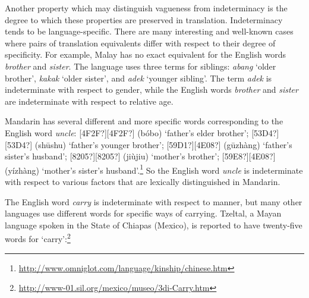 Another property which may distinguish vagueness from indeterminacy is the degree to which these properties are preserved in translation. Indeterminacy tends to be language-specific. There are many interesting and well-known cases where pairs of translation equivalents differ with respect to their degree of specificity. For example, Malay has no exact equivalent for the English words \textit{brother} and \textit{sister}. The language uses three terms for siblings: \textit{abang} ‘older brother’, \textit{kakak} ‘older sister’, and \textit{adek} ‘younger sibling’. The term \textit{adek} is indeterminate with respect to gender, while the English words \textit{brother} and \textit{sister} are indeterminate with respect to relative age.



Mandarin has several different and more specific words corresponding to the English word \textit{uncle}: [4F2F?][4F2F?] (bóbo) ‘father’s elder brother’; [53D4?][53D4?] (sh\=ushu) ‘father’s younger brother’; [59D1?][4E08?] (g\=uzhàng) ‘father’s sister’s husband’; [8205?][8205?] (jiùjiu) ‘mother’s brother’; [59E8?][4E08?] (yízhàng) ‘mother’s sister’s husband’.\footnote{\url{http://www.omniglot.com/language/kinship/chinese.htm}}  So the English word \textit{uncle} is indeterminate with respect to various factors that are lexically distinguished in Mandarin.



The English word \textit{carry} is indeterminate with respect to manner, but many other languages use different words for specific ways of carrying. Tzeltal, a Mayan language spoken in the State of Chiapas (Mexico), is reported to have twenty-five words for ‘carry’:\footnote{\url{http://www-01.sil.org/mexico/museo/3di-Carry.htm}} 


